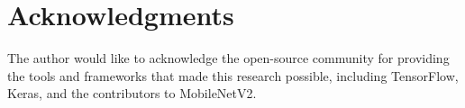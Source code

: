 \documentclass[12pt,a4paper]{article}
\begin{document}
\section*{Acknowledgments}

The author would like to acknowledge the open-source community for 
providing the tools and frameworks that made this research possible, 
including TensorFlow, Keras, and the contributors to MobileNetV2.

\nocite{*}




\end{document}
